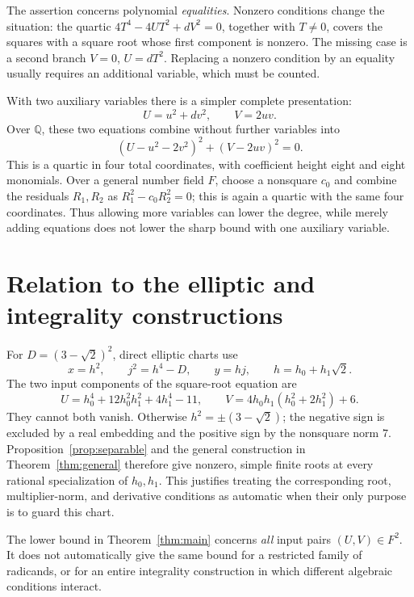 \documentclass[11pt,a4paper]{article}
\newcommand{\Q}{\mathbb Q}\newcommand{\Z}{\mathbb Z}
\begin{document}
The assertion concerns polynomial \emph{equalities}. Nonzero conditions
change the situation: the quartic $4T^4-4UT^2+dV^2=0$, together
with $T\ne0$, covers the squares with a square root whose first
component is nonzero. The missing case is a second branch
$V=0$, $U=dT^2$. Replacing a nonzero condition by an equality
usually requires an additional variable, which must be counted.

With two auxiliary variables there is a simpler complete presentation:
\begin{equation}\label{eq:twoquad}
                   U=u^2+dv^2,\qquad V=2uv.
\end{equation}
Over $\Q$, these two equations combine without further variables into
\begin{equation}\label{eq:quartic}
             (U-u^2-2v^2)^2+(V-2uv)^2=0.
\end{equation}
This is a quartic in four total coordinates, with coefficient height
eight and eight monomials. Over a general number field $F$, choose
a nonsquare $c_0$ and combine the residuals $R_1,R_2$ as
$R_1^2-c_0R_2^2=0$; this is again a quartic with the same four
coordinates. Thus allowing more variables can lower the degree,
while merely adding equations does not lower the sharp bound with
one auxiliary variable.

\section{Relation to the elliptic and integrality constructions}

For $D=(3-\sqrt2)^2$, direct elliptic charts use
\[
       x=h^2,\qquad j^2=h^4-D,\qquad y=hj,
       \qquad h=h_0+h_1\sqrt2.
\]
The two input components of the square-root equation are
\[
 U=h_0^4+12h_0^2h_1^2+4h_1^4-11,\qquad
 V=4h_0h_1(h_0^2+2h_1^2)+6.
\]
They cannot both vanish. Otherwise $h^2=\pm(3-\sqrt2)$;
the negative sign is excluded by a real embedding and the positive
sign by the nonsquare norm $7$. Proposition~\ref{prop:separable}
and the general construction in Theorem~\ref{thm:general}
therefore give nonzero, simple finite roots at every rational
specialization of $h_0,h_1$. This justifies treating the corresponding
root, multiplier-norm, and derivative conditions as automatic when
their only purpose is to guard this chart.

The lower bound in Theorem~\ref{thm:main} concerns \emph{all} input
pairs $(U,V)\in F^2$. It does not automatically give the same bound
for a restricted family of radicands, or for an entire integrality
construction in which different algebraic conditions interact.
\end{document}
